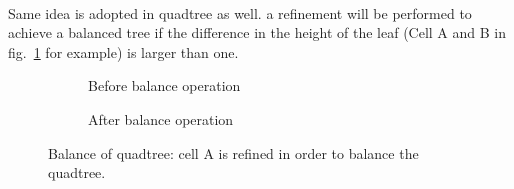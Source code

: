 \paragraph{}
Same idea is adopted in quadtree as well.
a refinement will be performed to achieve a balanced tree if the difference in the height of the leaf (Cell A and B in fig.~\ref{qdt_fig:tree_balance_quadtree} for example) is larger than one.
    \begin{figure}[h!]
        \begin{subfigure}[b]{0.5\linewidth}
            \centering
            \caption{Before balance operation}
        \end{subfigure}
        \begin{subfigure}[b]{0.5\linewidth}
            \centering
            \caption{After balance operation}
        \end{subfigure}
        \caption{Balance of quadtree: cell A is refined in order to balance the quadtree.}
        \label{qdt_fig:tree_balance_quadtree}
    \end{figure}

